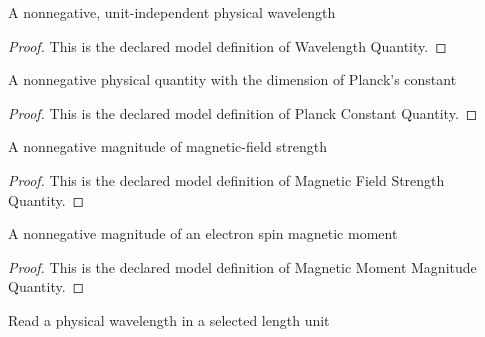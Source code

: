 \begin{definition}
  \label{def:physics:phyx-mini-0578:phyxminiproblems-problemphyxmini0578-wavelengthquantity}
  A nonnegative, unit-independent physical wavelength
\end{definition}
\begin{proof}
  This is the declared model definition of Wavelength Quantity.
\end{proof}
\begin{definition}
  \label{def:physics:phyx-mini-0578:phyxminiproblems-problemphyxmini0578-planckconstantquantity}
  A nonnegative physical quantity with the dimension of Planck's constant
\end{definition}
\begin{proof}
  This is the declared model definition of Planck Constant Quantity.
\end{proof}
\begin{definition}
  \label{def:physics:phyx-mini-0578:phyxminiproblems-problemphyxmini0578-magneticfieldstrengthquantity}
  A nonnegative magnitude of magnetic-field strength
\end{definition}
\begin{proof}
  This is the declared model definition of Magnetic Field Strength Quantity.
\end{proof}
\begin{definition}
  \label{def:physics:phyx-mini-0578:phyxminiproblems-problemphyxmini0578-magneticmomentmagnitudequantity}
  A nonnegative magnitude of an electron spin magnetic moment
\end{definition}
\begin{proof}
  This is the declared model definition of Magnetic Moment Magnitude Quantity.
\end{proof}
\begin{definition}
  \label{def:physics:phyx-mini-0578:phyxminiproblems-problemphyxmini0578-wavelengthreadout}
  Read a physical wavelength in a selected length unit
\end{definition}
